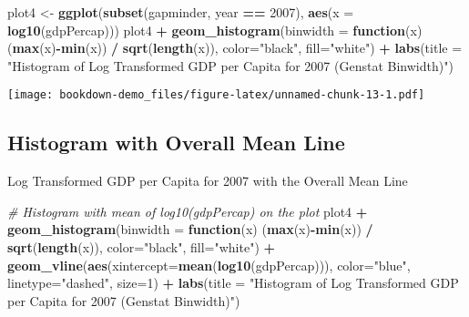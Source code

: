 \documentclass[
]{book}
\newenvironment{Shaded}{\begin{snugshade}}{\end{snugshade}}
\newcommand{\CommentTok}[1]{\textcolor[rgb]{0.56,0.35,0.01}{\textit{#1}}}
\newcommand{\ControlFlowTok}[1]{\textcolor[rgb]{0.13,0.29,0.53}{\textbf{#1}}}
\newcommand{\DataTypeTok}[1]{\textcolor[rgb]{0.13,0.29,0.53}{#1}}
\newcommand{\DecValTok}[1]{\textcolor[rgb]{0.00,0.00,0.81}{#1}}
\newcommand{\KeywordTok}[1]{\textcolor[rgb]{0.13,0.29,0.53}{\textbf{#1}}}
\newcommand{\NormalTok}[1]{#1}
\newcommand{\OperatorTok}[1]{\textcolor[rgb]{0.81,0.36,0.00}{\textbf{#1}}}
\newcommand{\StringTok}[1]{\textcolor[rgb]{0.31,0.60,0.02}{#1}}
\begin{document}
\begin{Shaded}
\begin{Highlighting}[]
\NormalTok{plot4 <-}\StringTok{ }\KeywordTok{ggplot}\NormalTok{(}\KeywordTok{subset}\NormalTok{(gapminder, year }\OperatorTok{==}\StringTok{ }\DecValTok{2007}\NormalTok{),}
                \KeywordTok{aes}\NormalTok{(}\DataTypeTok{x =} \KeywordTok{log10}\NormalTok{(gdpPercap)))}
\NormalTok{plot4 }\OperatorTok{+}\StringTok{ }
\StringTok{   }\KeywordTok{geom_histogram}\NormalTok{(}\DataTypeTok{binwidth =} \ControlFlowTok{function}\NormalTok{(x) (}\KeywordTok{max}\NormalTok{(x)}\OperatorTok{-}\KeywordTok{min}\NormalTok{(x)) }\OperatorTok{/}\StringTok{ }\KeywordTok{sqrt}\NormalTok{(}\KeywordTok{length}\NormalTok{(x)), }\DataTypeTok{color=}\StringTok{"black"}\NormalTok{, }\DataTypeTok{fill=}\StringTok{"white"}\NormalTok{) }\OperatorTok{+}
\StringTok{  }\KeywordTok{labs}\NormalTok{(}\DataTypeTok{title =} \StringTok{"Histogram of  Log Transformed GDP per Capita for 2007 (Genstat Binwidth)"}\NormalTok{)}
\end{Highlighting}
\end{Shaded}

\texttt{[image: bookdown-demo\_files/figure-latex/unnamed-chunk-13-1.pdf]}

\pagebreak

\hypertarget{histogram-with-overall-mean-line}{%
\subsection{Histogram with Overall Mean Line}\label{histogram-with-overall-mean-line}}

Log Transformed GDP per Capita for 2007 with the Overall Mean Line

\begin{Shaded}
\begin{Highlighting}[]
\CommentTok{# Histogram with mean of log10(gdpPercap) on the plot}
\NormalTok{plot4 }\OperatorTok{+}\StringTok{ }
\StringTok{  }\KeywordTok{geom_histogram}\NormalTok{(}\DataTypeTok{binwidth =} \ControlFlowTok{function}\NormalTok{(x) (}\KeywordTok{max}\NormalTok{(x)}\OperatorTok{-}\KeywordTok{min}\NormalTok{(x)) }\OperatorTok{/}\StringTok{ }\KeywordTok{sqrt}\NormalTok{(}\KeywordTok{length}\NormalTok{(x)), }\DataTypeTok{color=}\StringTok{"black"}\NormalTok{, }\DataTypeTok{fill=}\StringTok{"white"}\NormalTok{) }\OperatorTok{+}
\StringTok{  }\KeywordTok{geom_vline}\NormalTok{(}\KeywordTok{aes}\NormalTok{(}\DataTypeTok{xintercept=}\KeywordTok{mean}\NormalTok{(}\KeywordTok{log10}\NormalTok{(gdpPercap))),}
            \DataTypeTok{color=}\StringTok{"blue"}\NormalTok{, }\DataTypeTok{linetype=}\StringTok{"dashed"}\NormalTok{, }\DataTypeTok{size=}\DecValTok{1}\NormalTok{) }\OperatorTok{+}
\StringTok{  }\KeywordTok{labs}\NormalTok{(}\DataTypeTok{title =} \StringTok{"Histogram of  Log Transformed GDP per Capita for 2007 (Genstat Binwidth)"}\NormalTok{)}
\end{Highlighting}
\end{Shaded}
\end{document}
